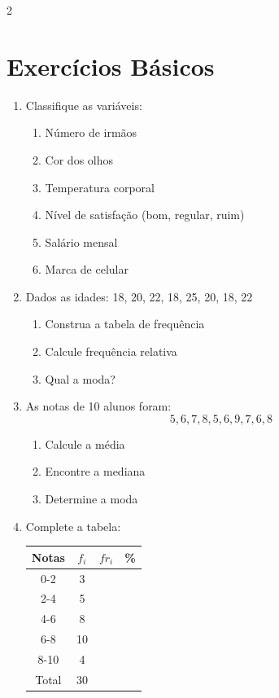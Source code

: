 \documentclass[11pt]{article}
\begin{document}
\begin{multicols}{2}
\section*{Exercícios Básicos}

\begin{enumerate}[leftmargin=*]

\item Classifique as variáveis:
\begin{enumerate}[label=\alph*)]
\item Número de irmãos
\item Cor dos olhos
\item Temperatura corporal
\item Nível de satisfação (bom, regular, ruim)
\item Salário mensal
\item Marca de celular
\end{enumerate}

\item Dados as idades: 18, 20, 22, 18, 25, 20, 18, 22
\begin{enumerate}[label=\alph*)]
\item Construa a tabela de frequência
\item Calcule frequência relativa
\item Qual a moda?
\end{enumerate}

\item As notas de 10 alunos foram:
\[
5, 6, 7, 8, 5, 6, 9, 7, 6, 8
\]
\begin{enumerate}[label=\alph*)]
\item Calcule a média
\item Encontre a mediana
\item Determine a moda
\end{enumerate}

\item Complete a tabela:
\begin{center}
\begin{tabular}{|c|c|c|c|}
\hline
\textbf{Notas} & \textbf{$f_i$} & \textbf{$fr_i$} & \textbf{\%} \\
\hline
0-2 & 3 & & \\
2-4 & 5 & & \\
4-6 & 8 & & \\
6-8 & 10 & & \\
8-10 & 4 & & \\
\hline
Total & 30 & & \\
\hline
\end{tabular}
\end{center}


\end{enumerate}
\end{multicols}
\end{document}
